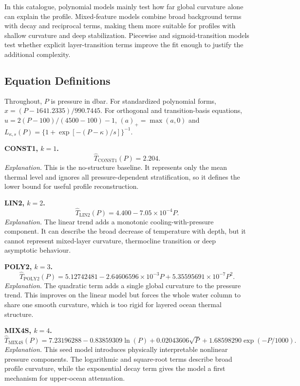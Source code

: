 \documentclass[10pt]{article}
\begin{document}
\vspace{0.55em}
\noindent
In this catalogue, polynomial models mainly test how far global curvature alone can explain the profile.
Mixed-feature models combine broad background terms with decay and reciprocal terms, making them more suitable for profiles with shallow curvature and deep stabilization.
Piecewise and sigmoid-transition models test whether explicit layer-transition terms improve the fit enough to justify the additional complexity.

\clearpage
\subsection{Equation Definitions}

\noindent
Throughout, $P$ is pressure in dbar.
For standardized polynomial forms, $x=(P-1641.2335)/990.7445$.
For orthogonal and transition-basis equations, $u=2(P-100)/(4500-100)-1$, $(a)_+=\max(a,0)$ and $L_{\kappa,s}(P)=\{1+\exp[-(P-\kappa)/s]\}^{-1}$.

\vspace{0.35em}
\noindent\textbf{CONST1, $k=1$.}
\[
\hat{T}_{\mathrm{CONST1}}(P)=2.204.
\]
\noindent\emph{Explanation.}
This is the no-structure baseline. It represents only the mean thermal level and ignores all pressure-dependent stratification, so it defines the lower bound for useful profile reconstruction.

\vspace{0.35em}
\noindent\textbf{LIN2, $k=2$.}
\[
\hat{T}_{\mathrm{LIN2}}(P)=4.400-7.05\times10^{-4}P.
\]
\noindent\emph{Explanation.}
The linear trend adds a monotonic cooling-with-pressure component. It can describe the broad decrease of temperature with depth, but it cannot represent mixed-layer curvature, thermocline transition or deep asymptotic behaviour.

\vspace{0.35em}
\noindent\textbf{POLY2, $k=3$.}
\[
\hat{T}_{\mathrm{POLY2}}(P)=5.12742481
-2.64606596\times10^{-3}P
+5.35595691\times10^{-7}P^2.
\]
\noindent\emph{Explanation.}
The quadratic term adds a single global curvature to the pressure trend. This improves on the linear model but forces the whole water column to share one smooth curvature, which is too rigid for layered ocean thermal structure.

\vspace{0.35em}
\noindent\textbf{MIX4S, $k=4$.}
\[
\hat{T}_{\mathrm{MIX4S}}(P)=
7.23196288
-0.83859309\ln(P)
+0.02043606\sqrt{P}
+1.68598290\exp(-P/1000).
\]
\noindent\emph{Explanation.}
This seed model introduces physically interpretable nonlinear pressure components. The logarithmic and square-root terms describe broad profile curvature, while the exponential decay term gives the model a first mechanism for upper-ocean attenuation.
\end{document}
